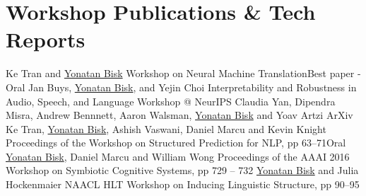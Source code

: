 \documentclass[10pt,letter]{moderncv}
\newcommand{\YB}{\underline{Yonatan Bisk}}
\begin{document}
\section{Workshop Publications \& Tech Reports}
  {\href{https://arxiv.org/abs/1805.10850}{\color{linkcolor}{Inducing Grammars with and for Neural Machine Translation}}}
  {Ke Tran and \YB{}}
  {Workshop on Neural Machine Translation}{Best paper - Oral}{}
\pub{--}
  {\href{https://openreview.net/forum?id=rJxEso0osm}{\color{linkcolor}{Bridging HMMs and RNNs Through Architectural Transformations}}}
  {Jan Buys, \YB{}, and Yejin Choi}
  {Interpretability and Robustness in Audio, Speech, and Language Workshop @ NeurIPS}{}{}
\pub{--}
  {\href{https://arxiv.org/abs/1801.07357}{\color{linkcolor}{CHALET: Cornell House Agent Learning Environment}}}
  {Claudia Yan, Dipendra Misra, Andrew Bennnett, Aaron Walsman, \YB{} and Yoav Artzi}
  {ArXiv}{}{}
  {\href{http://yonatanbisk.com/papers/2016-EMNLP-StrcPred.pdf}{\color{linkcolor}{Unsupervised Neural Hidden Markov Models}}}
  {Ke Tran, \YB{}, Ashish Vaswani, Daniel Marcu and Kevin Knight}
  {Proceedings of the Workshop on Structured Prediction for NLP, pp 63--71}{Oral}{}
\pub{--}
  {\href{http://yonatanbisk.com/papers/2016-AAAI-Wksp.pdf}{\color{linkcolor}{Towards a Dataset for Human Computer Communication via Grounded Language Acquisition}}}
  {\YB{}, Daniel Marcu and William Wong}
  {Proceedings of the AAAI 2016 Workshop on Symbiotic Cognitive Systems, pp 729 -- 732}{}{}
  {\href{http://yonatanbisk.com/papers/2012-NAACL-WILS.pdf}{\color{linkcolor}{Induction of Linguistic Structure with Combinatory Categorial Grammars}}}
  {\YB{} and Julia Hockenmaier}
  {NAACL HLT Workshop on Inducing Linguistic Structure, pp 90--95}{}{}
\end{document}
